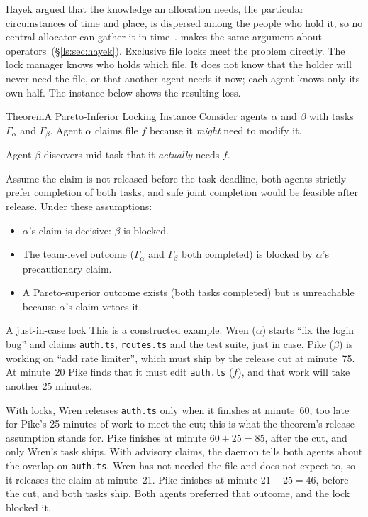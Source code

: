 \documentclass[11pt,a4paper]{article}
\theoremstyle{definition}
\theoremstyle{remark}
\begin{document}
Hayek argued that the knowledge an allocation needs, the particular
circumstances of time and place, is dispersed among the people who hold it,
so no central allocator can gather it in time~.
 makes the same argument about
operators\ifpdbook\ (\S\ref{ls:sec:hayek})\fi. Exclusive file locks meet the
problem directly. The lock manager knows who holds which file. It does not
know that the holder will never need the file, or that another agent needs it
now; each agent knows only its own half. The instance below shows the
resulting loss.

\begin{pdclaim}{Theorem}{A Pareto-Inferior Locking Instance}
\setlength{\parskip}{4pt plus 1pt}
\label{prop:sen}
Consider agents $\alpha$ and $\beta$ with tasks $\Gamma_\alpha$ and $\Gamma_\beta$. Agent $\alpha$ claims file $f$ because it \emph{might} need to modify it.

Agent $\beta$ discovers mid-task that it \emph{actually} needs $f$.

Assume the claim is not released before the task deadline, both agents
strictly prefer completion of both tasks, and safe joint completion would be
feasible after release. Under these assumptions:
\begin{itemize}[nosep]
  \item $\alpha$'s claim is decisive: $\beta$ is blocked.
  \item The team-level outcome ($\Gamma_\alpha$ and $\Gamma_\beta$ both completed) is blocked by $\alpha$'s precautionary claim.
  \item A Pareto-superior outcome exists (both tasks completed) but is unreachable because $\alpha$'s claim vetoes it.
\end{itemize}
\end{pdclaim}

\begin{pdexample}{A just-in-case lock}
This is a constructed example. Wren ($\alpha$) starts ``fix the login bug''
and claims \texttt{auth.ts}, \texttt{routes.ts} and the test suite, just in
case. Pike ($\beta$) is working on ``add rate limiter'', which must ship by
the release cut at minute~75. At minute~20 Pike finds that it must edit
\texttt{auth.ts} ($f$), and that work will take another 25 minutes.

With locks, Wren releases \texttt{auth.ts} only when it finishes at
minute~60, too late for Pike's 25 minutes of work to meet the cut; this is
what the theorem's release assumption stands for. Pike finishes at minute
$60+25=85$, after the cut, and only Wren's task ships. With advisory
claims, the daemon tells both agents about the overlap on \texttt{auth.ts}.
Wren has not needed the file and does not expect to, so it releases the claim
at minute~21. Pike finishes at minute $21+25=46$, before the cut, and both
tasks ship. Both agents preferred that outcome, and the lock blocked it.
\end{pdexample}
\end{document}
